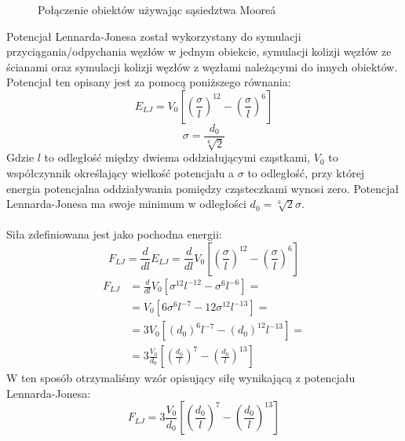 \documentclass[12pt, letterpaper]{report}
\begin{document}
\begin{figure}
        \caption{Połączenie obiektów używając sąsiedztwa Moore\'a}
    \end{figure}

    Potencjał Lennarda-Jonesa został wykorzystany do symulacji przyciągania/odpychania 
    węzłów w jednym obiekcie, symulacji kolizji węzłów ze ścianami oraz symulacji
    kolizji węzłów z węzłami należącymi do innych obiektów. 
    Potencjał ten opisany jest za pomocą poniższego równania:
    \begin{equation}
        E_{LJ} = V_0 \left[ \left( \frac{\sigma}{l} \right)^{12} - \left( \frac{\sigma}{l} \right)^{6} \right]
    \end{equation}
    \begin{equation}
        \sigma = \frac{d_0}{\sqrt[6]{2}}
    \end{equation}
    Gdzie $l$ to odległość między dwiema oddziałującymi cząstkami, $V_0$ to współczynnik określający wielkość potencjału 
    a $\sigma$ to odległość, przy której energia potencjalna oddziaływania pomiędzy cząsteczkami wynosi zero. 
    Potencjał Lennarda-Jonesa ma swoje minimum w odległości $d_0 = \sqrt[6]{2} \sigma$. \\ \\
    Siła zdefiniowana jest jako pochodna energii:
    \begin{equation}
        F_{LJ} = 
        \frac{d}{dl} E_{LJ} = 
        \frac{d}{dl} V_0 \left[ \left( \frac{\sigma}{l} \right)^{12} - \left( \frac{\sigma}{l} \right)^{6} \right]
    \end{equation}
    \begin{align*}
        F_{LJ} &= \frac{d}{dl} V_0 \left[ \sigma^{12}l^{-12} - \sigma^{6}l^{-6} \right] =\\
        &= V_0 \left[ 6\sigma^{6}l^{-7} - 12\sigma^{12}l^{-13} \right] =\\
        &= 3 V_0 \left[ (d_{0})^{6} l^{-7} - (d_{0})^{12} l^{-13} \right] =\\
        &= 3\frac{V_0}{d_0} \left[ \left(\frac{d_0}{l}\right)^{7} - \left(\frac{d_0}{l}\right)^{13} \right]
    \end{align*}
    W ten sposób otrzymaliśmy wzór opisujący siłę wynikającą z potencjału Lennarda-Jonesa:
    \begin{equation}
        F_{LJ} = 3\frac{V_0}{d_0} \left[ \left(\frac{d_0}{l}\right)^{7} - \left(\frac{d_0}{l}\right)^{13} \right]
    \end{equation}

    \clearpage
\end{document}
